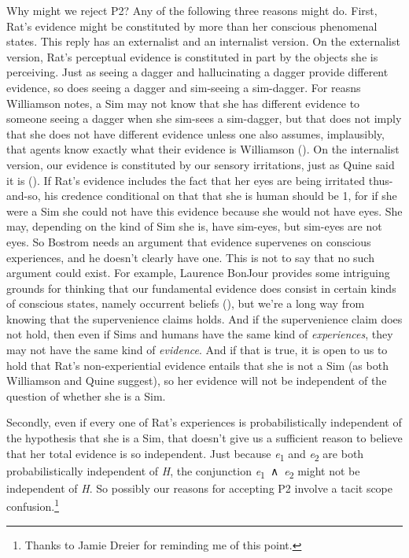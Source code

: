 \documentclass[
  11pt,
  letterpaper,
  DIV=11,
  numbers=noendperiod,
  twoside]{scrartcl}
\begin{document}
Why might we reject P2? Any of the following three reasons might do.
First, Rat's evidence might be constituted by more than her conscious
phenomenal states. This reply has an externalist and an internalist
version. On the externalist version, Rat's perceptual evidence is
constituted in part by the objects she is perceiving. Just as seeing a
dagger and hallucinating a dagger provide different evidence, so does
seeing a dagger and sim-seeing a sim-dagger. For reasns Williamson
notes, a Sim may not know that she has different evidence to someone
seeing a dagger when she sim-sees a sim-dagger, but that does not imply
that she does not have different evidence unless one also assumes,
implausibly, that agents know exactly what their evidence is Williamson
(). On the internalist
version, our evidence is constituted by our sensory irritations, just as
Quine said it is (). If Rat's
evidence includes the fact that her eyes are being irritated
thus-and-so, his credence conditional on that that she is human should
be 1, for if she were a Sim she could not have this evidence because she
would not have eyes. She may, depending on the kind of Sim she is, have
sim-eyes, but sim-eyes are not eyes. So Bostrom needs an argument that
evidence supervenes on conscious experiences, and he doesn't clearly
have one. This is not to say that no such argument could exist. For
example, Laurence BonJour provides some intriguing grounds for thinking
that our fundamental evidence does consist in certain kinds of conscious
states, namely occurrent beliefs (), but we're a long way from knowing that the supervenience claims
holds. And if the supervenience claim does not hold, then even if Sims
and humans have the same kind of \emph{experiences}, they may not have
the same kind of \emph{evidence}. And if that is true, it is open to us
to hold that Rat's non-experiential evidence entails that she is not a
Sim (as both Williamson and Quine suggest), so her evidence will not be
independent of the question of whether she is a Sim.

Secondly, even if every one of Rat's experiences is probabilistically
independent of the hypothesis that she is a Sim, that doesn't give us a
sufficient reason to believe that her total evidence is so independent.
Just because \emph{e}\textsubscript{1} and \emph{e}\textsubscript{2} are
both probabilistically independent of \emph{H}, the conjunction
\emph{e}\textsubscript{1}~∧~\emph{e}\textsubscript{2} might not be
independent of \emph{H}. So possibly our reasons for accepting P2
involve a tacit scope confusion.\footnote{Thanks to Jamie Dreier for
  reminding me of this point.}
\end{document}
